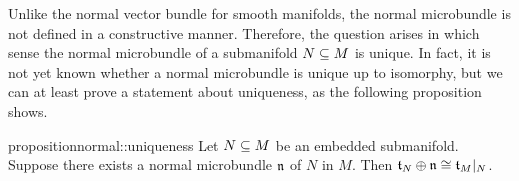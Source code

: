 \begin{myparagraph}
    Unlike the normal vector bundle for smooth manifolds,
    the normal microbundle is not defined in a constructive manner.
    Therefore, the question arises in which sense the normal microbundle
    of a submanifold $N \subseteq{} M$ is unique.
    In fact, it is not yet known whether a normal microbundle is unique up to isomorphy,
    but we can at least prove a statement about uniqueness,
    as the following proposition shows.
\end{myparagraph}

\begin{mystatement}{proposition}{normal::uniqueness}
    Let $N \subseteq{} M$ be an embedded submanifold.
    Suppose there exists a normal microbundle $\mathfrak{n}$ of $N$ in $M$.
    Then $\mathfrak{t}_N \oplus \mathfrak{n} \cong \mathfrak{t}_M\vert_{N}$.
\end{mystatement}

